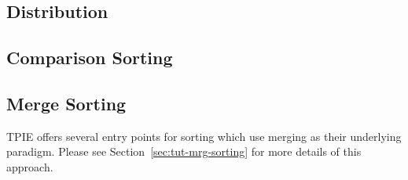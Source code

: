 


\subsection{Distribution}

\tobewritten


\subsection{Comparison Sorting}

\subsection{Merge Sorting} 

TPIE offers several entry points for sorting which use
merging as their underlying paradigm. Please see
Section~\ref{sec:tut-mrg-sorting} for more details of this
approach.

